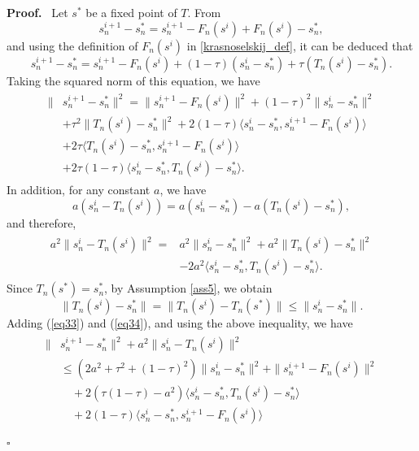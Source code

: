 \documentclass[twocolumn]{autart}
\newenvironment{proof}[1][Proof]{%
  \par\noindent\textbf{#1.}\ }{%
  \hfill$\square$\par
}
\begin{document}
\begin{proof}
	Let $s^*$ be a fixed point of $T$. From \[s_n^{i+1} - s_n^* = s_n^{i+1} - F_n(s^i) + F_n(s^i) - s_n^*,\] and using the definition of $F_n(s^i)$ in \eqref{krasnoselskij_def}, it can be deduced that
	\[
		s_n^{i+1}-s_n^*=s_n^{i+1}-F_n(s^i)+(1-\tau)(s_n^i-s_n^*)+\tau(T_n(s^i)-s_n^*).
	\]
	Taking the squared norm of this equation, we have
	\begin{equation}\label{eq33}
		\begin{aligned}
		\begin{split}
		\|&s_n^{i+1}-s_n^*\|^2=\|s_n^{i+1}-F_n(s^i)\|^2+(1-\tau)^2\|s_n^i-s_n^*\|^2\\
		&+\tau^2\|T_n(s^i)-s_n^*\|^2+2(1-\tau)\langle s_n^i-s_n^*, s_n^{i+1}-F_n(s^i)\rangle\\
		&+2\tau\langle T_n(s^i)-s_n^*, s_n^{i+1}-F_n(s^i)\rangle\\
		&+2\tau(1-\tau)\langle s_n^i-s_n^*,T_n(s^i)-s_n^*\rangle.
		\end{split}
		\end{aligned}
	\end{equation}
	In addition, for any constant $a$, we have \[a(s_n^i-T_n(s^i))=a(s_n^i-s_n^*)-a(T_n(s^i)-s_n^*),\] and therefore,
	\begin{equation}\label{eq34}
	\begin{aligned}
	\begin{split}
	a^2\|s_n^i-T_n(s^i)\|^2=&a^2\|s_n^i-s_n^*\|^2+a^2\|T_n(s^i)-s_n^*\|^2\\
	& -2a^2\langle s_n^i-s_n^*, T_n(s^i)-s_n^*\rangle.
	\end{split}
	\end{aligned}
	\end{equation}
	Since $T_n(s^*)=s_n^*$, by Assumption \ref{ass5}, we obtain
    \[\|T_n(s^i)-s_n^*\|=\|T_n(s^i)-T_n(s^*)\|\leq\|s_n^i-s_n^*\|.\]
     Adding (\ref{eq33}) and (\ref{eq34}), and using the above inequality, we have
	\begin{equation}\label{eq35}
		\begin{aligned}
		\begin{split}
		\|&s_n^{i+1}-s_n^*\|^2+a^2\|s_n^i-T_n(s^i)\|^2\\
		&\leq (2a^2+\tau^2+(1-\tau)^2)\|s_n^i-s_n^*\|^2+\|s_n^{i+1}-F_n(s^i)\|^2\\
		&\quad+2(\tau(1-\tau)-a^2)\langle s_n^i-s_n^*,T_n(s^i)-s_n^*\rangle\\
		&\quad+2(1-\tau)\langle s_n^i-s_n^*, s_n^{i+1}-F_n(s^i)\rangle\\

\end{split}
\end{aligned}
\end{equation}
\end{proof}
\end{document}
